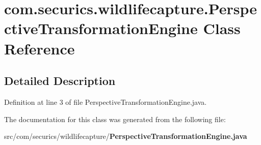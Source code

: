 \section{com.\+securics.\+wildlifecapture.\+Perspective\+Transformation\+Engine Class Reference}
\label{classcom_1_1securics_1_1wildlifecapture_1_1_perspective_transformation_engine}


\subsection{Detailed Description}


Definition at line 3 of file Perspective\+Transformation\+Engine.\+java.



The documentation for this class was generated from the following file\+:\begin{DoxyCompactItemize}
\item 
src/com/securics/wildlifecapture/{\bf Perspective\+Transformation\+Engine.\+java}\end{DoxyCompactItemize}
